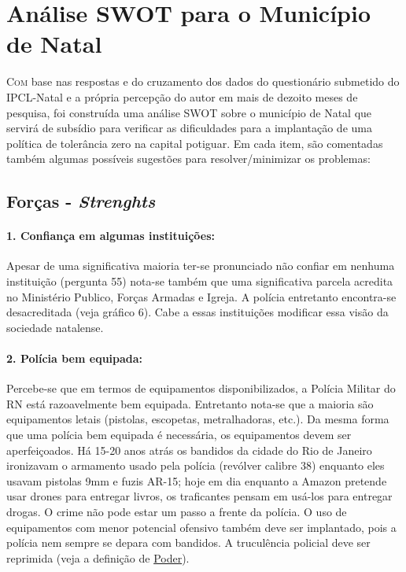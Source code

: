 \documentclass[
	12pt,				%
	openright,			%
	twoside,			%
	a4paper,			%
	chapter=TITLE,		%
	section=TITLE,		%
	subsection=TITLE,	%
	subsubsection=TITLE,%
	spanish,            %
	english,			%
	brazil				%
	]{abntex2}
\begin{document}
\section{Análise SWOT para o Município de Natal}
\lettrine[lines=2, lhang=0.33, loversize=0.25]{C}{om} base nas respostas e do cruzamento dos dados do questionário submetido do  IPCL-Natal e a própria percepção do autor em mais de dezoito meses de pesquisa, foi
construída uma análise SWOT sobre o município
de Natal que servirá de subsídio para verificar as dificuldades para a implantação de uma política de tolerância zero
na capital potiguar. Em cada item, são comentadas também algumas possíveis sugestões para resolver/minimizar os problemas:

\subsection{Forças - \textit{Strenghts}}
\hypertarget{S1}{} 
\paragraph*{\textbf{1. Confiança em algumas instituições:}} Apesar de uma significativa maioria ter-se pronunciado não confiar em nenhuma instituição (pergunta 55) nota-se também que  uma significativa parcela acredita no Ministério Publico, Forças Armadas e Igreja. A polícia entretanto encontra-se desacreditada (veja gráfico 6). Cabe a essas instituições modificar essa visão da sociedade natalense.\\
\hypertarget{S2}{}
\paragraph*{\textbf{2. Polícia bem equipada:}} Percebe-se que em termos de equipamentos disponibilizados, a Polícia Militar do RN está razoavelmente bem equipada. Entretanto nota-se que a maioria são equipamentos letais (pistolas, escopetas, metralhadoras, etc.). Da mesma forma que uma polícia bem equipada é necessária, os equipamentos devem ser aperfeiçoados. Há 15-20 anos atrás os bandidos da cidade do Rio de Janeiro ironizavam o armamento usado pela polícia (revólver calibre 38) enquanto eles usavam pistolas 9mm e fuzis AR-15; hoje em dia enquanto a Amazon pretende usar drones para entregar livros, os traficantes pensam em usá-los para entregar drogas. O crime não pode estar um passo a frente da polícia. O uso de equipamentos com menor potencial ofensivo também deve ser implantado, pois a polícia nem sempre se depara com bandidos. A truculência policial deve ser reprimida (veja a definição de \hyperlink{poder}{Poder}).
\hypertarget{S3}{}
\end{document}
